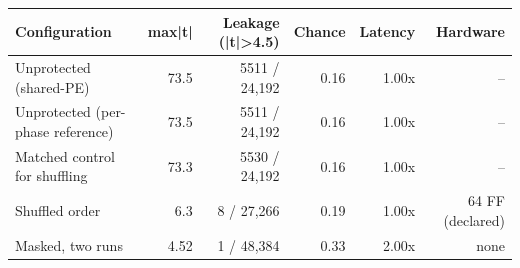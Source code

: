 \begin{tabular}{@{}lrrrrr@{}}
\toprule
Configuration & max|t| & Leakage (|t|>4.5) & Chance & Latency & Hardware \\
\midrule
Unprotected (shared-PE) & 73.5 & 5511 / 24,192 & 0.16 & 1.00x & -- \\
Unprotected (per-phase reference) & 73.5 & 5511 / 24,192 & 0.16 & 1.00x & -- \\
Matched control for shuffling & 73.3 & 5530 / 24,192 & 0.16 & 1.00x & -- \\
Shuffled order & 6.3 & 8 / 27,266 & 0.19 & 1.00x & 64 FF (declared) \\
Masked, two runs & 4.52 & 1 / 48,384 & 0.33 & 2.00x & none \\
\bottomrule
\end{tabular}
